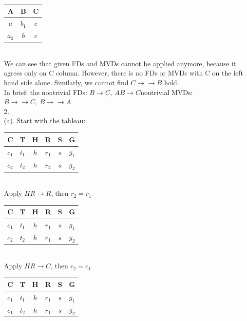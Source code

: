\documentclass[12pt]{article}
\begin{document}
\begin{tabular}{|c|c|c|}
\hline
A & B & C  \\
\hline
$a$ & $b_{1}$ & $c$  \\
\hline
$a_{2}$ & $b$ & $c$  \\
\hline
\end{tabular}\\

We can see that given FDs and MVDs cannot be applied anymore, because it agrees only on C column. However, there is no FDs or MVDs with C on the left hand side alone. Similarly, we cannot find $C\rightarrow\rightarrow B$ hold.\\

In brief: the nontrivial FDs: $B\rightarrow C,\ AB\rightarrow C$\qquad nontrivial MVDs: $B\rightarrow\rightarrow C,\ B\rightarrow\rightarrow A$\\



2.\\
(a). Start with the tableau:\\

\begin{tabular}{|c|c|c|c|c|c|}
\hline
C & T & H & R & S & G \\
\hline
$c_{1}$ & $t_{1}$ & $h$ & $r_{1}$ & $s$ & $g_{1}$ \\
\hline
$c_{2}$ & $t_{2}$ & $h$ & $r_{2}$ & $s$ & $g_{2}$\\
\hline
\end{tabular}\\

Apply $HR\rightarrow R$, then $r_{2}=r_{1}$\\

\begin{tabular}{|c|c|c|c|c|c|}
\hline
C & T & H & R & S & G \\
\hline
$c_{1}$ & $t_{1}$ & $h$ & $r_{1}$ & $s$ & $g_{1}$ \\
\hline
$c_{2}$ & $t_{2}$ & $h$ & $r_{1}$ & $s$ & $g_{2}$\\
\hline
\end{tabular}\\

Apply $HR\rightarrow C$, then $c_{2}=c_{1}$\\

\begin{tabular}{|c|c|c|c|c|c|}
\hline
C & T & H & R & S & G \\
\hline
$c_{1}$ & $t_{1}$ & $h$ & $r_{1}$ & $s$ & $g_{1}$ \\
\hline
$c_{1}$ & $t_{2}$ & $h$ & $r_{1}$ & $s$ & $g_{2}$\\
\hline
\end{tabular}\\
\end{document}
